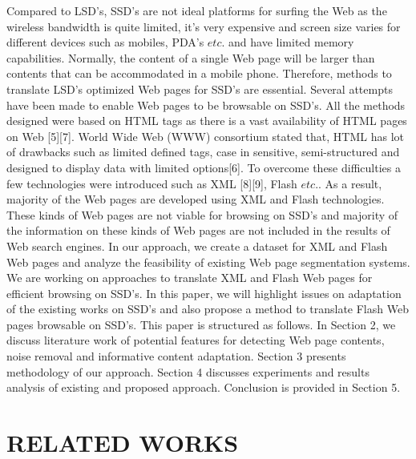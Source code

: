 \documentclass[fleqn,twoside]{article}
\begin{document}
Compared to LSD's, SSD's are not ideal platforms for surfing the Web as the wireless bandwidth is quite limited, it's very expensive and screen size varies for different devices such as mobiles, PDA's $etc.$ and have limited memory capabilities. Normally, the content of a single Web page will be larger than contents that can be accommodated in a mobile phone. Therefore, methods to translate LSD's optimized Web pages for SSD's are essential. Several attempts have been made to enable Web pages to be browsable on SSD's. All the methods designed were based on HTML tags as there is a vast availability of HTML pages on Web [5][7]. World Wide Web (WWW) consortium stated that, HTML has lot of drawbacks such as limited defined tags, case in sensitive, semi-structured and designed to display data with limited options[6]. To overcome these difficulties a few technologies were introduced such as XML [8][9], Flash $etc.$. As a result, majority of the Web pages are developed using XML and Flash technologies. These kinds of Web pages are not viable for browsing on SSD's and majority of the information on these kinds of Web pages are not included in the results of Web search engines.
\vskip 2mm		
In our approach, we create a dataset for XML and Flash Web pages and analyze the feasibility of existing Web page segmentation systems. We are working on approaches to translate XML and Flash Web pages for efficient browsing on SSD's. In this paper, we will highlight issues on adaptation of the existing works on SSD's and also propose a method to translate Flash Web pages browsable on SSD's. This paper is structured as follows. In Section 2, we discuss literature work of potential features for detecting Web page contents, noise removal and informative content adaptation. Section 3 presents methodology of our approach. Section 4 discusses experiments and results analysis of existing and proposed approach. Conclusion is provided in Section 5.

\section{RELATED WORKS}
\label {section:RoL}
\end{document}

